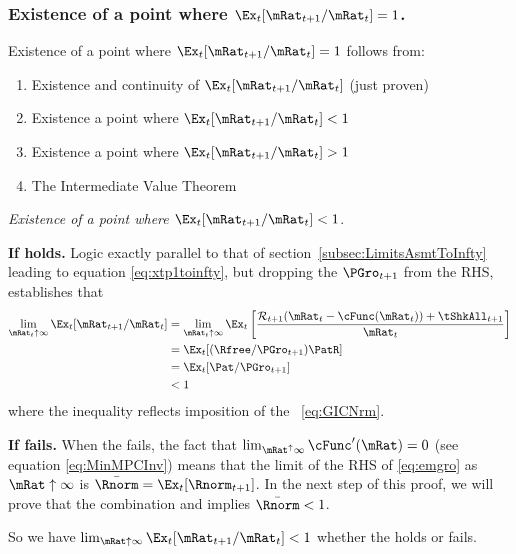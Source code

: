 \documentclass[\econtexRoot/BufferStockTheory]{subfiles}
\begin{document}
\subsubsection{Existence of a point where $\Ex_t [{\mRat}_{t+1}/\mRat_t]=1$.}

Existence of a point where $\Ex_t [{\mRat}_{t+1}/\mRat_t] = 1$ follows from:
\begin{enumerate}
\item Existence and continuity of $\Ex_t [{\mRat}_{t+1}/\mRat_t]$ (just proven)
  \item Existence a point where $\Ex_t [{\mRat}_{t+1}/\mRat_t] < 1$
  \item Existence a point where $\Ex_t [{\mRat}_{t+1}/\mRat_t] > 1$
    \item The Intermediate Value Theorem
    \end{enumerate}

\noindent    \textit{Existence of a point where $\Ex_t [{\mRat}_{t+1}/\mRat_t] < 1$}.
    
\textbf{If {\RIC} holds.}  Logic exactly parallel to that of section~\ref{subsec:LimitsAsmtToInfty} leading to equation \eqref{eq:xtp1toinfty}, but dropping the $\PGro_{t+1}$ from the RHS, establishes that
\begin{align}
  \lim_{\mRat_{t} \uparrow \infty} \Ex_{t}[{\mRat}_{t+1}/\mRat_{t}]  & =   
                                                                       \lim_{\mRat_{t} \uparrow \infty} 
                                                                       \Ex_{t}\left[\frac{{\mathcal{\mathcal{R}}}_{t+1}(\mRat_{t}-\cFunc(\mRat_{t}))+{\tShkAll}_{t+1}}{\mRat_{t}}\right] \notag 
  \\  & = \Ex_{t}[(\Rfree/{\PGro}_{t+1})\PatR]  \notag
  \\  & = \Ex_{t}[{\Pat}/{\PGro}_{t+1}]  \label{eq:emgro}
  \\  & < 1 \notag
\end{align}
where the inequality reflects imposition of the \GICNrm~\eqref{eq:GICNrm}.

\textbf{If {\RIC} fails.}  When the {\RIC} fails, the fact that $\lim_{\mRat^{\uparrow} \infty} \cFunc^{\prime}(\mRat) = 0$ (see equation \eqref{eq:MinMPCInv}) means that the limit of the RHS of \eqref{eq:emgro} as $\mRat \uparrow \infty$ is $\bar{\Rnorm}=\Ex_{t}[\Rnorm_{t+1}]$.  In the next step of this proof, we will prove that the combination {\GICNrm} and \cncl{\RIC} implies $\bar{\Rnorm} < 1$.

So we have $\lim_{\mRat \uparrow \infty} \Ex_{t}[\mRat_{t+1}/\mRat_{t}] < 1$ whether the {\RIC} holds or fails.
\end{document}
